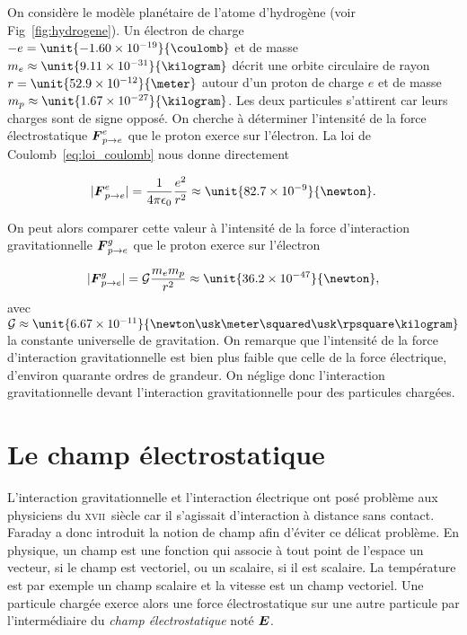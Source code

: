 \begin{exemple}
	\label{ex:hydrogene}
	On considère le modèle planétaire de l'atome d'hydrogène 
	(voir Fig~\ref{fig:hydrogene}).
	Un électron de charge $-e = \unit{-1.60 \times 10^{-19}}{\coulomb}$ et 
	de masse $m_e \approx \unit{9.11 \times 10^{-31}}{\kilogram}$ décrit une
	orbite circulaire de rayon $r = \unit{52.9 \times 10^{-12}}{\meter}$
	autour d'un proton de charge $e$ et de masse
	$m_p \approx \unit{1.67 \times 10^{-27}}{\kilogram}$. 
	Les deux particules s'attirent car leurs charges sont de signe opposé. 
	On cherche à déterminer l'intensité 
	de la force électrostatique $\vecf^e_{p \rightarrow e}$ que le proton 
	exerce sur l'électron.
	La loi de Coulomb~\ref{eq:loi_coulomb} nous donne directement

	\begin{equation*}
		|\vecf^e_{p \rightarrow e}| = \dfrac{1}{4\pi\epsilon_0}
		                         \dfrac{e^2}{r^2}
					\approx \unit{82.7 \times 10^{-9}}{\newton}.
	\end{equation*}

	On peut alors comparer cette valeur à l'intensité de la force 
	d'interaction gravitationnelle
	$\vecf^g_{p \rightarrow e}$ que le proton exerce sur l'électron
	
	\begin{equation*}
		|\vecf^g_{p \rightarrow e}| = \mathcal{G}
		                         \dfrac{m_e m_p}{r^2}
					\approx \unit{36.2 \times 10^{-47}}{\newton},
	\end{equation*}
	avec $\mathcal{G} \approx \unit{6.67 \times 10^{-11}}{\newton \usk 
	\meter \squared \usk \rpsquare \kilogram}$ la constante universelle de
	gravitation. On remarque que l'intensité de la force 
	d'interaction gravitationnelle est bien plus faible que celle de la 
	force électrique, d'environ quarante ordres de grandeur.
	On néglige donc l'interaction gravitationnelle devant l'interaction
	gravitationnelle pour des
	particules chargées.
\end{exemple}


\section{Le champ électrostatique}
L'interaction gravitationnelle et l'interaction électrique ont posé problème aux 
physiciens du \textsc{xvii}\ieme~siècle car il s'agissait d'interaction à distance
sans contact. Faraday a donc introduit la notion de champ afin d'éviter 
ce délicat problème.
En physique, un champ est une fonction qui associe à tout point de l'espace un vecteur,
si le champ est vectoriel, ou un scalaire, si il est scalaire.
La température est par exemple un champ scalaire
et la vitesse est un champ vectoriel.
Une particule chargée exerce alors une force électrostatique sur une autre particule 
par l'intermédiaire du \emph{champ électrostatique} noté $\vece$.

